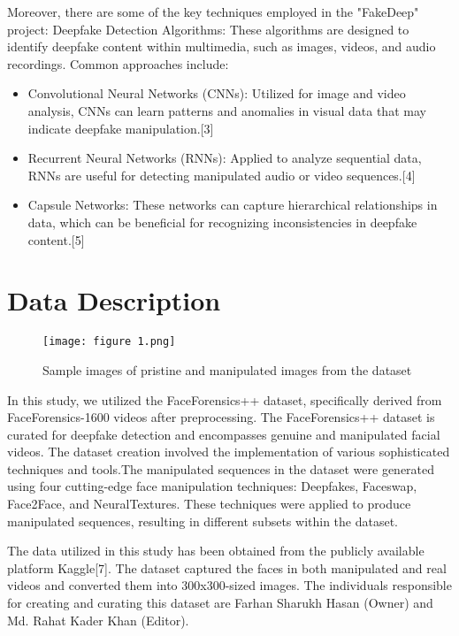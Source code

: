 \documentclass{article}
\begin{document}
Moreover, there are some of the key techniques employed in the "FakeDeep" project:
Deepfake Detection Algorithms: These algorithms are designed to identify deepfake content within multimedia, such as images, videos, and audio recordings. Common approaches include:

\begin{itemize}
    \item Convolutional Neural Networks (CNNs): Utilized for image and video analysis, CNNs can learn patterns and anomalies in visual data that may indicate deepfake manipulation.[3]
  
    \item Recurrent Neural Networks (RNNs): Applied to analyze sequential data, RNNs are useful for detecting manipulated audio or video sequences.[4]

    \item Capsule Networks: These networks can capture hierarchical relationships in data, which can be beneficial for recognizing inconsistencies in deepfake content.[5]
\end{itemize}



\section{Data Description}
\begin{figure}[h]
    \centering
    \texttt{[image: figure 1.png]}
    \caption{Sample images of pristine and manipulated images from the dataset}
    \label{fig:enter-label}
\end{figure}
In this study, we utilized the FaceForensics++ dataset, specifically derived from FaceForensics-1600 videos after preprocessing. The FaceForensics++ dataset is curated for deepfake detection and encompasses genuine and manipulated facial videos. The dataset creation involved the implementation of various sophisticated techniques and tools.The manipulated sequences in the dataset were generated using four cutting-edge face manipulation techniques: Deepfakes, Faceswap, Face2Face, and NeuralTextures. These techniques were applied to produce manipulated sequences, resulting in different subsets within the dataset.

The data utilized in this study has been obtained from the publicly available platform Kaggle[7]. The dataset captured the faces in both manipulated and real videos and converted them into 300x300-sized images. The individuals responsible for creating and curating this dataset are Farhan Sharukh Hasan (Owner) and Md. Rahat Kader Khan (Editor).
\end{document}
